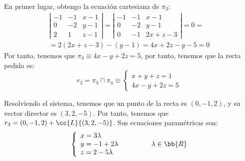 \begin{ejercicio}
\begin{enumerate}
        En primer lugar, obtengo la ecuación cartesiana de $\pi_3$:
        \begin{multline*}
            \left|\begin{array}{ccc}
                -1 & -1 & x-1 \\
                0 & -2 & y-1 \\
                2 & 1 & z-1
            \end{array}\right|=
            \left|\begin{array}{ccc}
                -1 & -1 & x-1 \\
                0 & -2 & y-1 \\
                0 & -1 & 2x+z-3
            \end{array}\right|= 0 =\\= 2(2x+z-3) -(y-1) = 4x+2z-y-5=0
        \end{multline*}
        Por tanto, tenemos que $\pi_3\equiv 4x-y+2z=5$, por tanto, tenemos que la recta pedida es:
        \begin{equation*}
            r_3 = \pi_3\cap \pi_4 \equiv \left\{
                \begin{array}{l}
                    x + y + z = 1 \\
                    4x-y+2z=5
                \end{array}
            \right.
        \end{equation*}

        Resolviendo el sistema, tenemos que un punto de la recta es $(0, -1, 2)$, y su vector director es $(3,2,-5)$. Por tanto, tenemos que $r_3=(0, -1, 2)+\cc{L}\{(3,2,-5)\}$. Sus ecuaciones paramétricas son:
        \begin{equation*}
            \left\{
                \begin{array}{l}
                    x = 3\lambda \\
                    y = -1+2\lambda \\
                    z = 2-5\lambda
                \end{array}
            \right. \qquad \qquad \lambda\in \bb{R}
        \end{equation*}
    \end{enumerate}
\end{ejercicio}

